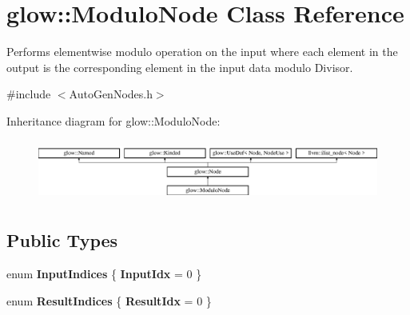 \hypertarget{classglow_1_1_modulo_node}{}\section{glow\+:\+:Modulo\+Node Class Reference}
\label{classglow_1_1_modulo_node}


Performs elementwise modulo operation on the input where each element in the output is the corresponding element in the input data modulo Divisor.  




{\ttfamily \#include $<$Auto\+Gen\+Nodes.\+h$>$}

Inheritance diagram for glow\+:\+:Modulo\+Node\+:\begin{figure}[H]
\begin{center}
\leavevmode
\includegraphics[height=2.028986cm]{classglow_1_1_modulo_node}
\end{center}
\end{figure}
\subsection*{Public Types}
\begin{DoxyCompactItemize}
\item 
\mbox{\label{classglow_1_1_modulo_node_ac60c0fb1a12c394cb330942e3839d2dc}} 
enum {\bfseries Input\+Indices} \{ {\bfseries Input\+Idx} = 0
 \}
\item 
\mbox{\label{classglow_1_1_modulo_node_a23a8a0186b20350f8fd342b6afc8cba8}} 
enum {\bfseries Result\+Indices} \{ {\bfseries Result\+Idx} = 0
 \}
\end{DoxyCompactItemize}
